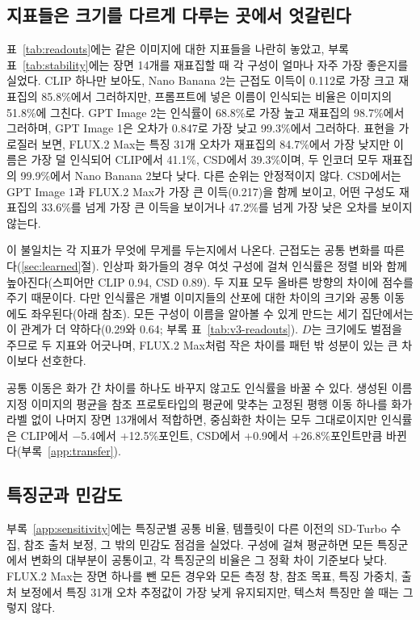 \documentclass[10pt]{article}
\begin{document}
\subsection{지표들은 크기를 다르게 다루는 곳에서 엇갈린다}\label{sec:readouts}

표~\ref{tab:readouts}에는 같은 이미지에 대한 지표들을 나란히 놓았고, 부록 표~\ref{tab:stability}에는
장면 14개를 재표집할 때 각 구성이 얼마나 자주 가장 좋은지를 실었다. CLIP 하나만 보아도, Nano Banana
2는 근접도 이득이 0.112로 가장 크고 재표집의 85.8\%에서 그러하지만, 프롬프트에 넣은 이름이 인식되는
비율은 이미지의 51.8\%에 그친다. GPT Image 2는 인식률이 68.8\%로 가장 높고 재표집의 98.7\%에서
그러하며, GPT Image 1은 오차가 0.847로 가장 낮고 99.3\%에서 그러하다. 표현을 가로질러 보면, FLUX.2
Max는 특징 31개 오차가 재표집의 84.7\%에서 가장 낮지만 이름은 가장 덜 인식되어 CLIP에서 41.1\%, CSD에서
39.3\%이며, 두 인코더 모두 재표집의 99.9\%에서 Nano Banana 2보다 낮다. 다른 순위는 안정적이지 않다.
CSD에서는 GPT Image 1과 FLUX.2 Max가 가장 큰 이득(0.217)을 함께 보이고, 어떤 구성도 재표집의
33.6\%를 넘게 가장 큰 이득을 보이거나 47.2\%를 넘게 가장 낮은 오차를 보이지 않는다.

이 불일치는 각 지표가 무엇에 무게를 두는지에서 나온다. 근접도는 공통 변화를 따른다(\ref{sec:learned}절).
인상파 화가들의 경우 여섯 구성에 걸쳐 인식률은 정렬 비와 함께 높아진다(스피어만 CLIP 0.94, CSD 0.89).
두 지표 모두 올바른 방향의 차이에 점수를 주기 때문이다. 다만 인식률은 개별 이미지들의 산포에 대한 차이의
크기와 공통 이동에도 좌우된다(아래 참조). 모든 구성이 이름을 알아볼 수 있게 만드는 세기 집단에서는 이
관계가 더 약하다(0.29와 0.64; 부록 표~\ref{tab:v3-readouts}). $D$는 크기에도 벌점을 주므로 두 지표와
어긋나며, FLUX.2 Max처럼 작은 차이를 패턴 밖 성분이 있는 큰 차이보다 선호한다.

공통 이동은 화가 간 차이를 하나도 바꾸지 않고도 인식률을 바꿀 수 있다. 생성된 이름 지정 이미지의
평균을 참조 프로토타입의 평균에 맞추는 고정된 평행 이동 하나를 화가 라벨 없이 나머지 장면 13개에서
적합하면, 중심화한 차이는 모두 그대로이지만 인식률은 CLIP에서 $-$5.4에서 +12.5\%포인트, CSD에서
+0.9에서 +26.8\%포인트만큼 바뀐다(부록~\ref{app:transfer}).

\subsection{특징군과 민감도}\label{sec:sensitivity}

부록~\ref{app:sensitivity}에는 특징군별 공통 비율, 템플릿이 다른 이전의 SD-Turbo 수집, 참조 출처 보정,
그 밖의 민감도 점검을 실었다. 구성에 걸쳐 평균하면 모든 특징군에서 변화의 대부분이 공통이고, 각
특징군의 비율은 그 정확 차이 기준보다 낮다. FLUX.2 Max는 장면 하나를 뺀 모든 경우와 모든 측정 창, 참조
목표, 특징 가중치, 출처 보정에서 특징 31개 오차 추정값이 가장 낮게 유지되지만, 텍스처 특징만 쓸 때는
그렇지 않다.
\end{document}
